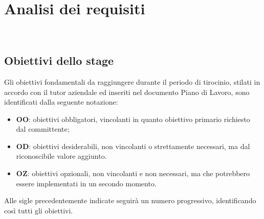 \chapter{Analisi dei requisiti}
\label{cap:analisi-requisiti}

\\

\section{Obiettivi dello stage}
\label{sec:obiettivi-stage}

Gli obiettivi fondamentali da raggiungere durante il periodo di tirocinio, stilati
in accordo con il tutor aziendale ed inseriti nel documento Piano di Lavoro, sono
identificati dalla seguente notazione:
\begin{itemize}
    \item \textbf{OO}: obiettivi obbligatori, vincolanti in quanto obiettivo primario richiesto dal committente;
    \item \textbf{OD}: obiettivi desiderabili, non vincolanti o strettamente necessari, ma dal riconoscibile valore aggiunto.
    \item \textbf{OZ}: obiettivi opzionali, non vincolanti e non necessari, ma che potrebbero essere implementati in un secondo momento.
\end{itemize}

Alle sigle precedentemente indicate seguirà un numero progressivo, identificando così
tutti gli obiettivi.


